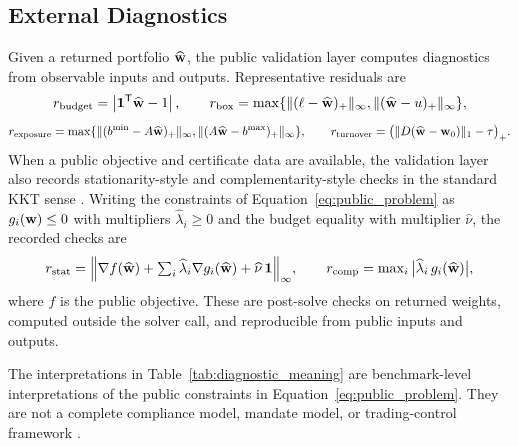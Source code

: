\documentclass[10pt,a4paper]{extarticle}
\begin{document}
\subsection{External Diagnostics}

Given a returned portfolio $\widehat{\mathbf{w}}$, the public validation layer
computes diagnostics from observable inputs and outputs. Representative
residuals are
\[
  r_{\mathrm{budget}}
  = \left| \mathbf{1}^{\mathsf{T}}\widehat{\mathbf{w}}-1 \right|,
\qquad
  r_{\mathrm{box}}
  = \max\{\|(\ell-\widehat{\mathbf{w}})_+\|_{\infty},
          \|(\widehat{\mathbf{w}}-u)_+\|_{\infty}\},
\]
\[
  r_{\mathrm{exposure}}
  = \max\{\|(b^{\min}-A\widehat{\mathbf{w}})_+\|_{\infty},
          \|(A\widehat{\mathbf{w}}-b^{\max})_+\|_{\infty}\},
\qquad
  r_{\mathrm{turnover}}
  = \big(\|D(\widehat{\mathbf{w}}-\mathbf{w}_0)\|_1-\tau\big)_+ .
\]
When a public objective and certificate data are available, the validation
layer also records stationarity-style and complementarity-style checks in the
standard KKT sense \citep{boydvandenberghe2004}. Writing the constraints of
Equation~\eqref{eq:public_problem} as $g_i(\mathbf{w})\leq 0$ with multipliers
$\widehat{\lambda}_i \geq 0$ and the budget equality with multiplier
$\widehat{\nu}$, the recorded checks are
\[
  r_{\mathrm{stat}}
  = \Big\| \nabla f(\widehat{\mathbf{w}})
    + \textstyle\sum_i \widehat{\lambda}_i \nabla g_i(\widehat{\mathbf{w}})
    + \widehat{\nu}\,\mathbf{1} \Big\|_{\infty},
\qquad
  r_{\mathrm{comp}}
  = \max_i \big| \widehat{\lambda}_i\, g_i(\widehat{\mathbf{w}}) \big|,
\]
where $f$ is the public objective. These are post-solve checks on returned
weights, computed outside the solver call, and reproducible from public inputs
and outputs.

The interpretations in Table~\ref{tab:diagnostic_meaning} are benchmark-level
interpretations of the public constraints in
Equation~\eqref{eq:public_problem}. They are not a complete compliance model,
mandate model, or trading-control framework
\citep{moehle2021taxaware,moehle2023lcso,acmartifact2020}.
\end{document}
